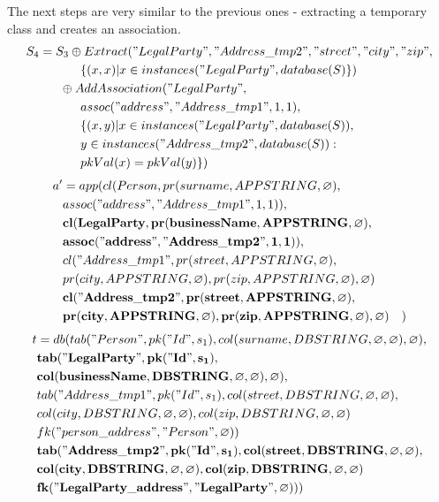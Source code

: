\documentclass[11pt]{article}
\begin{document}
\newpage
The next steps are very similar to the previous ones - extracting a temporary class and creates an association.
\begin{align*}
S_4 &= S_3 \oplus Extract("LegalParty", "Address\_tmp2", "street", "city", "zip",\\ 
& \;\;\;\;\;\; \;\;\;\;\;\;  \{(x,x) | x \in instances("LegalParty", database(S)\}) \\
& \;\;\;\;\;\; \oplus AddAssociation("LegalParty", \\ 
& \;\;\;\;\;\;\;\;\;\;\;\; assoc("address", "Address\_tmp1", 1, 1),\\ 
& \;\;\;\;\;\;\;\;\;\;\;\; \{(x,y)| x \in instances("LegalParty", database(S)), \\
& \;\;\;\;\;\; \;\;\;\;\;\; y \in instances("Address\_tmp2", database(S)) : \\ 
& \;\;\;\;\;\;\;\;\;\;\;\; pkVal(x) = pkVal(y) \})\end{align*}
\hline
\begin{align*}
a' &=app(cl(Person, pr(surname, APPSTRING, \varnothing), \\ 
& assoc("address", "Address\_tmp1", 1, 1)), \\ 
& \mathbf{cl(LegalParty, pr(businessName, APPSTRING, \varnothing)},\\
& \mathbf{assoc("address", "Address\_tmp2", 1, 1))}, \\
& cl("Address\_tmp1", pr(street, APPSTRING, \varnothing), \\
& pr(city, APPSTRING, \varnothing), pr(zip, APPSTRING, \varnothing), \varnothing) \\
& \mathbf{cl("Address\_tmp2", pr(street, APPSTRING, \varnothing)}, \\
& \mathbf{pr(city, APPSTRING, \varnothing), pr(zip, APPSTRING, \varnothing), \varnothing)}
& )
\end{align*}
\begin{align*}
t &=db(tab("Person", pk("Id", s_1), col(surname, DBSTRING, \varnothing, \varnothing), \varnothing), \\
& \mathbf{tab("LegalParty", pk("Id", s_1), } \\
& \mathbf{col(businessName, DBSTRING, \varnothing, \varnothing), \varnothing),} \\
& tab("Address\_tmp1", pk("Id", s_1), col(street, DBSTRING, \varnothing, \varnothing),\\
& col(city, DBSTRING, \varnothing, \varnothing), col(zip, DBSTRING, \varnothing, \varnothing) \\
& fk("person\_address", "Person", \varnothing))\\
& \mathbf{tab("Address\_tmp2", pk("Id", s_1), col(street, DBSTRING, \varnothing, \varnothing)},\\
& \mathbf{col(city, DBSTRING, \varnothing, \varnothing), col(zip, DBSTRING, \varnothing, \varnothing)} \\
& \mathbf{fk("LegalParty\_address", "LegalParty", \varnothing))}) 
\end{align*}
\end{document}
